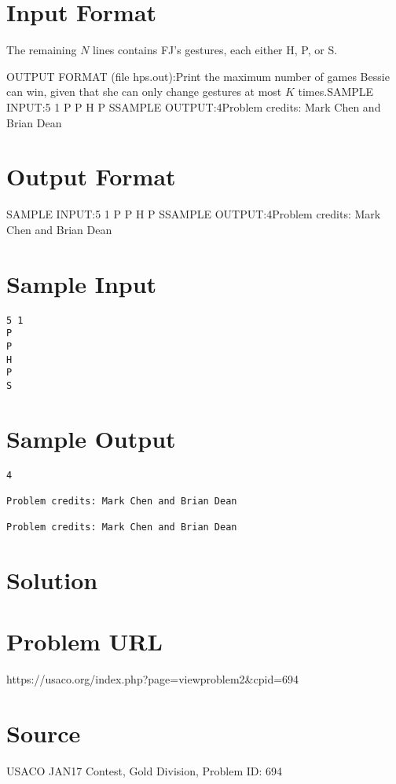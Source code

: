 \documentclass[12pt]{article}
\begin{document}
\section*{Input Format}
The remaining $N$ lines contains FJ's gestures, each either H, P, or S.

OUTPUT FORMAT (file hps.out):Print the maximum number of games Bessie can win, given that she can only change
gestures at most $K$ times.SAMPLE INPUT:5 1
P
P
H
P
SSAMPLE OUTPUT:4Problem credits: Mark Chen and Brian Dean

\section*{Output Format}
SAMPLE INPUT:5 1
P
P
H
P
SSAMPLE OUTPUT:4Problem credits: Mark Chen and Brian Dean

\section*{Sample Input}
\begin{verbatim}
5 1
P
P
H
P
S
\end{verbatim}

\section*{Sample Output}
\begin{verbatim}
4

Problem credits: Mark Chen and Brian Dean

Problem credits: Mark Chen and Brian Dean
\end{verbatim}

\section*{Solution}


\section*{Problem URL}
https://usaco.org/index.php?page=viewproblem2&cpid=694

\section*{Source}
USACO JAN17 Contest, Gold Division, Problem ID: 694
\end{document}

